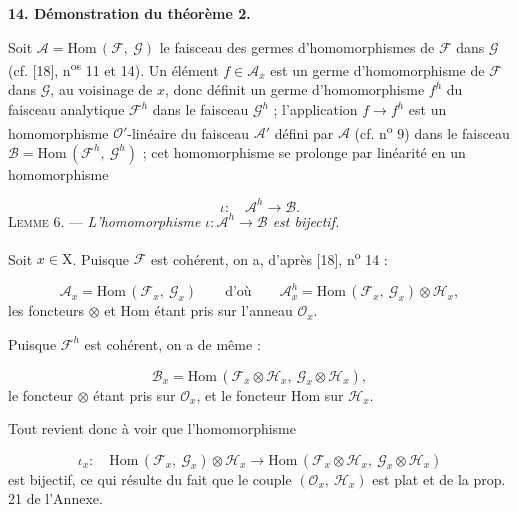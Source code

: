 \textbf{14. Démonstration du théorème 2.}

Soit $\mathcal{A} = \mathrm{Hom}\,(\mathcal{F},\ \mathcal{G})$ le faisceau des germes d'homomorphismes de $\mathcal{F}$ dans $\mathcal{G}$ (cf. [18], n\textsuperscript{os} 11 et 14). Un élément $f \in \mathcal{A}_x$ est un germe d'homomorphisme de $\mathcal{F}$ dans $\mathcal{G}$, au voisinage de $x$, donc définit un germe d'homomorphisme $f^{h}$ du faisceau analytique $\mathcal{F}^{h}$ dans le faisceau $\mathcal{G}^{h}$ ; l'application $f \to f^{h}$ est un homomorphisme $\mathcal{O}'$-linéaire du faisceau $\mathcal{A}'$ défini par $\mathcal{A}$ (cf. n\textsuperscript{o} 9) dans le faisceau $\mathcal{B} = \mathrm{Hom}\,(\mathcal{F}^{h},\ \mathcal{G}^{h})$ ; cet homomorphisme se prolonge par linéarité en un homomorphisme

\begin{equation*}
\iota : \quad \mathcal{A}^{h} \to \mathcal{B}.
\end{equation*}
\textsc{Lemme} 6. — \textit{L'homomorphisme $\iota : \mathcal{A}^{h} \to \mathcal{B}$ est bijectif.}

Soit $x \in \mathrm{X}$. Puisque $\mathcal{F}$ est cohérent, on a, d'après [18], n\textsuperscript{o} 14 :

\begin{equation*}
\mathcal{A}_{x} = \mathrm{Hom}\,(\mathcal{F}_{x},\ \mathcal{G}_{x}) \qquad \mbox{d'où} \qquad \mathcal{A}^{h}_{x} = \mathrm{Hom}\,(\mathcal{F}_{x},\ \mathcal{G}_{x}) \otimes \mathcal{H}_{x},
\end{equation*}
les foncteurs $\otimes$ et $\mathrm{Hom}$ étant pris sur l'anneau $\mathcal{O}_x$.

Puisque $\mathcal{F}^{h}$ est cohérent, on a de même :

\begin{equation*}
\mathcal{B}_{x} = \mathrm{Hom}\,(\mathcal{F}_{x} \otimes \mathcal{H}_{x},\ \mathcal{G}_{x} \otimes \mathcal{H}_{x}),
\end{equation*}
le foncteur $\otimes$ étant pris sur $\mathcal{O}_x$, et le foncteur $\mathrm{Hom}$ sur $\mathcal{H}_x$.

Tout revient donc à voir que l'homomorphisme

\begin{equation*}
\iota_{x} : \quad \mathrm{Hom}\,(\mathcal{F}_{x},\ \mathcal{G}_{x}) \otimes \mathcal{H}_{x} \to \mathrm{Hom}\,(\mathcal{F}_{x} \otimes \mathcal{H}_{x},\ \mathcal{G}_{x} \otimes \mathcal{H}_{x})
\end{equation*}
est bijectif, ce qui résulte du fait que le couple $(\mathcal{O}_x,\ \mathcal{H}_x)$ est plat et de la prop. 21 de l'Annexe.


